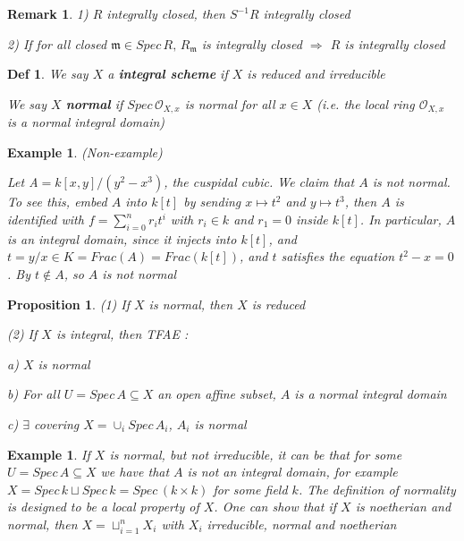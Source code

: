 \documentclass{article}
\newtheorem{definition}[theorem]{Def}
\newtheorem{example}[theorem]{Example}
\newtheorem{proposition}[theorem]{Proposition}
\newtheorem{remark}[theorem]{Remark}
\begin{document}
\begin{remark}
    1) $R$ integrally closed, then $S^{-1}R$ integrally closed

    2) If for all closed $\mathfrak m \in Spec\,R,\, R_{\mathfrak m}$ is integrally closed $\Rightarrow$ $R$ is integrally closed
\end{remark}

\begin{definition}
We say $X$ a \textbf{integral scheme} if $X$ is reduced and irreducible

We say $X$ \textbf{normal} if $Spec\,\mathcal O_{X,x}$ is normal for all $x\in X$ (i.e. the local ring $\mathcal O_{X,x}$ is a normal integral
domain)
\end{definition}

\begin{example}
(Non-example)

Let A$ = k[x, y]/(y^2 - x^3)$, the cuspidal cubic. We claim that $A$ is
not normal. To see this, embed $A$ into $k[t]$ by sending $x \mapsto t^2$ and $y \mapsto t^3$, then $A$ is identified with
$f =\sum_{i=0}^n
r_it^i$ with $r_i \in k$ and $r_1 = 0$ inside $k[t]$. In particular, $A$ is an integral domain, since it injects
into $k[t]$, and $t = y/x \in K = Frac(A) = Frac(k[t])$, and $t$ satisfies the equation $t^2 - x = 0$. By $t \notin A$,
so $A$ is not normal
\end{example}

\begin{proposition}
(1) If $X$ is normal, then $X$ is reduced

(2) If $X$ is integral, then TFAE :

a) $X$ is normal 

b) For all $U = Spec\, A \subseteq X$ an open affine subset, $A$ is a normal integral domain

c) $\exists$ covering $X=\cup_i Spec\,A_i$, $A_i$ is normal
\end{proposition}

\begin{example}
If $X$ is normal, but not irreducible, it can be that for some $U = Spec\, A \subseteq X$ we have
that $A$ is not an integral domain, for example $X = Spec\, k \sqcup Spec\, k = Spec\,(k \times k)$ for some field $k$. The
definition of normality is designed to be a local property of $X$. One can show that if $X$ is noetherian
and normal, then $X =\sqcup^n_{i=1} X_i$ with $X_i$
irreducible, normal and noetherian
\end{example}
\end{document}
